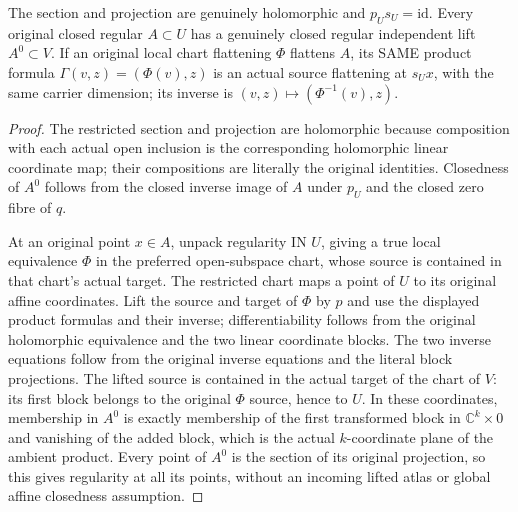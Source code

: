 \begin{lemma}
\label{hir:actual-open-zero-section-carrier-geometry}
\leanok
The section and projection are genuinely holomorphic and $p_Us_U=\mathrm{id}$. Every original closed regular $A\subset U$ has a genuinely closed regular independent lift $A^0\subset V$. If an original local chart flattening $\Phi$ flattens $A$, its SAME product formula $\Gamma(v,z)=(\Phi(v),z)$ is an actual source flattening at $s_Ux$, with the same carrier dimension; its inverse is $(v,z)\mapsto(\Phi^{-1}(v),z)$.
\end{lemma}
\begin{proof}
The restricted section and projection are holomorphic because composition with each actual open inclusion is the corresponding holomorphic linear coordinate map; their compositions are literally the original identities. Closedness of $A^0$ follows from the closed inverse image of $A$ under $p_U$ and the closed zero fibre of $q$.

At an original point $x\in A$, unpack regularity IN $U$, giving a true local equivalence $\Phi$ in the preferred open-subspace chart, whose source is contained in that chart's actual target. The restricted chart maps a point of $U$ to its original affine coordinates. Lift the source and target of $\Phi$ by $p$ and use the displayed product formulas and their inverse; differentiability follows from the original holomorphic equivalence and the two linear coordinate blocks. The two inverse equations follow from the original inverse equations and the literal block projections. The lifted source is contained in the actual target of the chart of $V$: its first block belongs to the original $\Phi$ source, hence to $U$. In these coordinates, membership in $A^0$ is exactly membership of the first transformed block in $\mathbb C^k\times0$ and vanishing of the added block, which is the actual $k$-coordinate plane of the ambient product. Every point of $A^0$ is the section of its original projection, so this gives regularity at all its points, without an incoming lifted atlas or global affine closedness assumption.
\end{proof}


